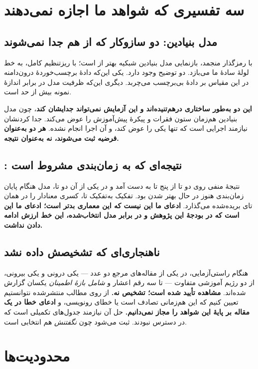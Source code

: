 \section{سه تفسیری که شواهد ما اجازه نمی‌دهند}

\subsection{مدل بنیادین: دو سازوکار که از هم جدا نمی‌شوند}

با رمزگذار منجمد، بازنمایی مدل بنیادین شبکیه بهتر از  است؛ با ریزتنظیم کامل، به
خط لولهٔ سادهٔ ما می‌بازد. دو توضیح وجود دارد. یکی این‌که دادهٔ برچسب‌خوردهٔ درون‌دامنه در این
مقیاس بر دادهٔ بی‌برچسب می‌چربد. دیگری این‌که ظرفیت مدل در برابر اندازهٔ نمونه بیش از حد است.

\textbf{این دو به‌طور ساختاری درهم‌تنیده‌اند و این آزمایش نمی‌تواند جدایشان کند}، چون مدل
بنیادین هم‌زمان ستون فقرات و پیکرهٔ پیش‌آموزش را عوض می‌کند. جدا کردنشان نیازمند اجرایی است که
تنها یکی را عوض کند، و آن اجرا انجام نشده. \textbf{هر دو به‌عنوان فرضیه ثبت می‌شوند، نه
به‌عنوان نتیجه.}

\subsection{: نتیجه‌ای که به زمان‌بندی مشروط است}

نتیجهٔ منفی  روی دو تا از پنج تا به دست آمد و در یکی از آن دو تا، مدل هنگام پایان
زمان‌بندی هنوز در حال بهتر شدن بود. تفکیک به‌تفکیک تا، کسری معنادار را در همان تای بریده‌شده
می‌گذارد. \textbf{ادعای ما این نیست که این معماری بدتر است؛ ادعای ما این است که در بودجهٔ این
پژوهش و در برابر مدل انتخاب‌شده، این خط ارزش ادامه دادن نداشت.}

\subsection{ناهنجاری‌ای که تشخیصش داده نشد}

هنگام راستی‌آزمایی، در یکی از مقاله‌های مرجع دو عدد  — یکی درونی و یکی بیرونی، از دو
رژیم آموزشی متفاوت — تا سه رقم اعشار و \emph{شامل بازهٔ اطمینان} یکسان گزارش شده‌اند.
\textbf{مشاهده تأیید شده است؛ تشخیص نه.} از روی مطالب منتشرشده نتوانستیم تعیین کنیم که این
هم‌زمانی تصادف است یا خطای رونویسی، و \textbf{ادعای خطا در یک مقاله بر پایهٔ این شواهد را
مجاز نمی‌دانیم.} حل آن نیازمند جدول‌های تکمیلی است که در دسترس نبودند. ثبت می‌شود چون
\emph{نگفتنش} هم انتخابی است.

\section{محدودیت‌ها}

